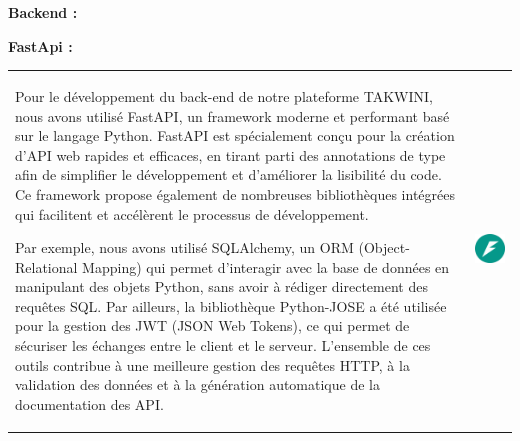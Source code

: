 \documentclass{article}
\begin{document}
\vspace{0,3cm}

\noindent \large \textbf{Backend :}

\vspace{0,5cm}
\newpage

\noindent \large \textbf{FastApi \cite{FastApi}:}

\vspace{0,3cm}

\noindent
\begin{tabular}
{@{}m{}@{\hspace{1em}}m{}@{}}
Pour le développement du back-end de notre plateforme TAKWINI, nous avons utilisé FastAPI, un framework moderne et performant basé sur le langage Python. FastAPI est spécialement conçu pour la création d’API web rapides et efficaces, en tirant parti des annotations de type afin de simplifier le développement et d’améliorer la lisibilité du code. Ce framework propose également de nombreuses bibliothèques intégrées qui facilitent et accélèrent le processus de développement.

Par exemple, nous avons utilisé SQLAlchemy, un ORM (Object-Relational Mapping) qui permet d’interagir avec la base de données en manipulant des objets Python, sans avoir à rédiger directement des requêtes SQL. Par ailleurs, la bibliothèque Python-JOSE a été utilisée pour la gestion des JWT (JSON Web Tokens), ce qui permet de sécuriser les échanges entre le client et le serveur. L’ensemble de ces outils contribue à une meilleure gestion des requêtes HTTP, à la validation des données et à la génération automatique de la documentation des API.


&
\includegraphics[width=\linewidth]{fastapi.png} %
\end{tabular}
\end{document}
